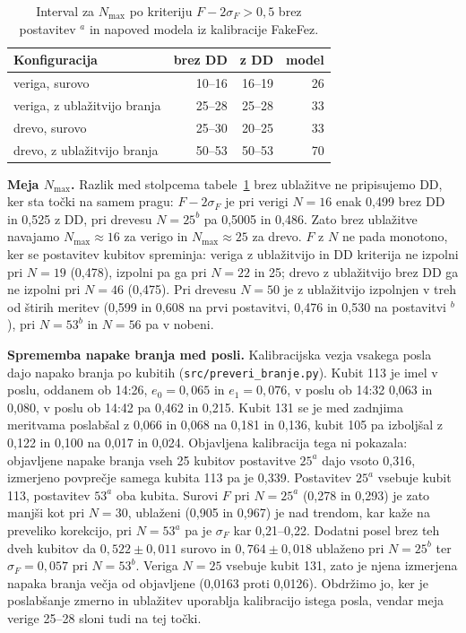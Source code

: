 \begin{table}[htbp]
\caption{Interval za $N_{\max}$ po kriteriju $F-2\sigma_F>0{,}5$ brez postavitev $^a$ in napoved modela iz kalibracije FakeFez.}
\label{g20:tab:nmax}
\centering
\begin{tabular}{lrrr}
\toprule
Konfiguracija & brez DD & z DD & model \\
\midrule
veriga, surovo & 10--16 & 16--19 & 26 \\
veriga, z ublažitvijo branja & 25--28 & 25--28 & 33 \\
drevo, surovo & 25--30 & 20--25 & 33 \\
drevo, z ublažitvijo branja & 50--53 & 50--53 & 70 \\
\bottomrule
\end{tabular}
\end{table}

\textbf{Meja $N_{\max}$.} Razlik med stolpcema tabele~\ref{g20:tab:nmax} brez ublažitve ne pripisujemo DD, ker sta točki na samem
pragu: $F-2\sigma_F$ je pri verigi $N=16$ enak 0,499 brez DD in 0,525 z DD, pri drevesu $N=25^b$ pa 0,5005 in 0,486. Zato brez
ublažitve navajamo $N_{\max}\approx 16$ za verigo in $N_{\max}\approx 25$ za drevo. $F$ z $N$ ne pada monotono, ker se postavitev kubitov
spreminja: veriga z ublažitvijo in DD kriterija ne izpolni pri $N=19$ (0,478), izpolni pa ga pri $N=22$ in 25; drevo z ublažitvijo
brez DD ga ne izpolni pri $N=46$ (0,475). Pri drevesu $N=50$ je z ublažitvijo izpolnjen v treh od štirih meritev (0,599 in 0,608 na
prvi postavitvi, 0,476 in 0,530 na postavitvi $^b$), pri $N=53^b$ in $N=56$ pa v nobeni.

\textbf{Sprememba napake branja med posli.} Kalibracijska vezja vsakega posla dajo napako branja po kubitih
(\texttt{src/preveri\_branje.py}). Kubit 113 je imel v poslu, oddanem ob 14:26, $e_0=0{,}065$ in $e_1=0{,}076$, v poslu ob 14:32 0,063 in 0,080, v poslu ob 14:42 pa
0,462 in 0,215. Kubit 131 se je med zadnjima meritvama poslabšal z 0,066 in 0,068 na 0,181 in 0,136, kubit 105 pa izboljšal z 0,122 in
0,100 na 0,017 in 0,024. Objavljena kalibracija tega ni pokazala: objavljene napake branja vseh 25 kubitov postavitve $25^a$ dajo
vsoto 0,316, izmerjeno povprečje samega kubita 113 pa je 0,339. Postavitev $25^a$ vsebuje kubit 113, postavitev $53^a$ oba kubita. Surovi $F$ pri
$N=25^a$ (0,278 in 0,293) je zato manjši kot pri $N=30$, ublaženi (0,905 in 0,967) je nad trendom, kar kaže na preveliko
korekcijo, pri $N=53^a$ pa je $\sigma_F$ kar 0,21--0,22. Dodatni posel brez teh dveh kubitov da $0{,}522\pm0{,}011$ surovo in
$0{,}764\pm0{,}018$ ublaženo pri $N=25^b$ ter $\sigma_F=0{,}057$ pri $N=53^b$. Veriga $N=25$ vsebuje kubit 131, zato je njena izmerjena napaka branja večja od objavljene (0,0163 proti 0,0126). Obdržimo jo, ker je poslabšanje zmerno in ublažitev uporablja kalibracijo istega posla, vendar meja verige 25--28 sloni tudi na tej točki.

